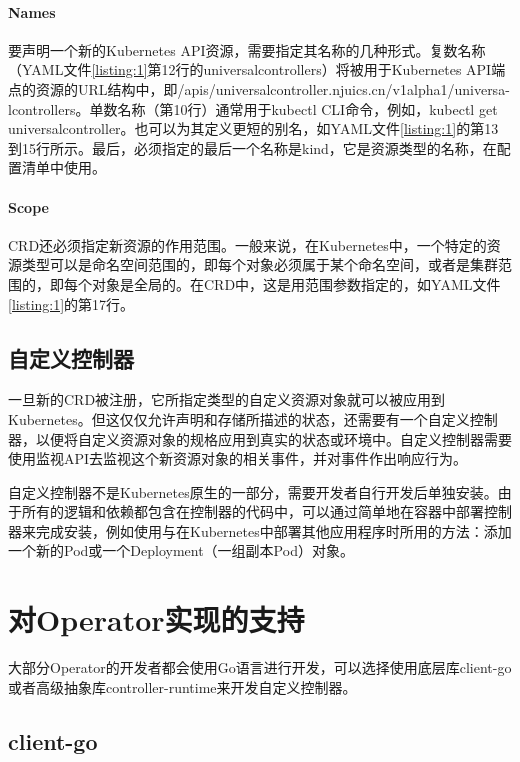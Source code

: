 \documentclass[macfonts,master]{njuthesis}
\begin{document}
\paragraph{Names}

要声明一个新的Kubernetes API资源，需要指定其名称的几种形式。复数名称（YAML文件\ref{listing:1}第12行的universalcontrollers）将被用于Kubernetes API端点的资源的URL结构中，即/apis/universalcontroller.njuics.cn/v1alpha1/universa-lcontrollers。单数名称（第10行）通常用于kubectl CLI命令，例如，kubectl get universalcontroller。也可以为其定义更短的别名，如YAML文件\ref{listing:1}的第13到15行所示。最后，必须指定的最后一个名称是kind，它是资源类型的名称，在配置清单中使用。

\paragraph{Scope}

CRD还必须指定新资源的作用范围。一般来说，在Kubernetes中，一个特定的资源类型可以是命名空间范围的，即每个对象必须属于某个命名空间，或者是集群范围的，即每个对象是全局的。在CRD中，这是用范围参数指定的，如YAML文件\ref{listing:1}的第17行。

\subsection{自定义控制器}

一旦新的CRD被注册，它所指定类型的自定义资源对象就可以被应用到Kubernetes。但这仅仅允许声明和存储所描述的状态，还需要有一个自定义控制器，以便将自定义资源对象的规格应用到真实的状态或环境中。自定义控制器需要使用监视API去监视这个新资源对象的相关事件，并对事件作出响应行为。

自定义控制器不是Kubernetes原生的一部分，需要开发者自行开发后单独安装。由于所有的逻辑和依赖都包含在控制器的代码中，可以通过简单地在容器中部署控制器来完成安装，例如使用与在Kubernetes中部署其他应用程序时所用的方法：添加一个新的Pod或一个Deployment（一组副本Pod）对象。

\section{对Operator实现的支持}\label{section:wayofimplement}

大部分Operator的开发者都会使用Go语言进行开发，可以选择使用底层库client-go或者高级抽象库controller-runtime来开发自定义控制器。

\subsection{client-go}
\end{document}
